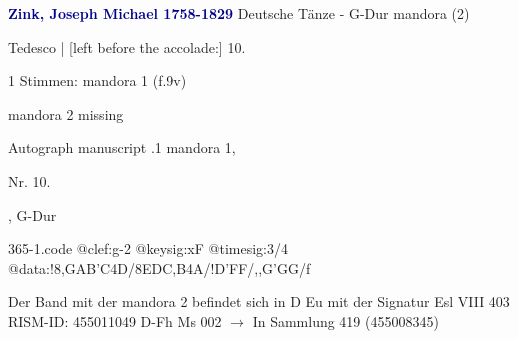 \documentclass[twocolumn]{book}
\begin{document}
\newline \par \vspace{7pt} \textcolor{darkblue}{\textbf{Zink, Joseph Michael  1758-1829}}
\newline Deutsche Tänze - G-Dur
\newline mandora (2)
\newline \begin{itshape}[f.9v, at left:] Tedesco | [left before the accolade:] 10.\end{itshape} 
\newline \textcolor{darkblue}{}  1 Stimmen: mandora 1  (f.9v)
\newline \begin{small} mandora 2 missing\end{small} 
\newline Autograph manuscript
.1  mandora 1, \begin{itshape}Nr. 10.\end{itshape}, G-Dur  
\begin{filecontents*}{365-1.code}
@clef:g-2
@keysig:xF
@timesig:3/4
@data:!{8,GAB'C}4D/{8EDC,B}4A/!D'FF/,,G'GG/f
\end{filecontents*}
\newline
%
\newline Der Band mit der mandora 2 befindet sich in D Eu mit der Signatur Esl VIII 403
\newline RISM-ID: 455011049
\newline D-Fh  Ms 002
\newline $\rightarrow$ In Sammlung 419 (455008345)
      
\end{document}
